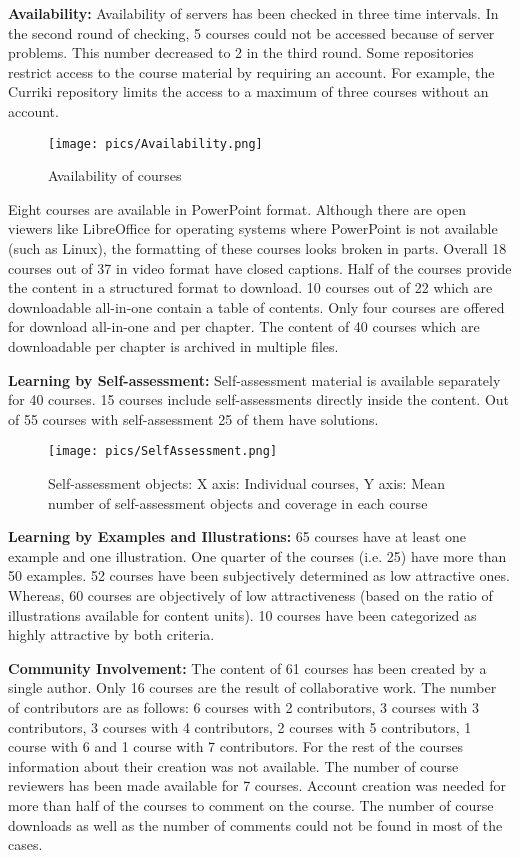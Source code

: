 \documentclass{sig-alternate}
\let\ednote\Ednote
\theoremstyle{definition}
\begin{document}
\noindent\textbf{Availability:}
Availability of servers has been checked in three time intervals.
In the second round of checking, 5 courses could not be accessed because of server problems.
This number decreased to 2 in the third round.
Some repositories restrict access to the course material by requiring an account.
For example, the Curriki repository limits the access to a maximum of three courses without an account.
\begin{figure}[h]
\texttt{[image: pics/Availability.png]}
\caption{Availability of courses}
\label{fig:availability}
\end{figure}
Eight courses are available in PowerPoint format.
Although there are open viewers like LibreOffice for operating systems where PowerPoint is not available (such as Linux), the formatting of these courses looks broken in parts.
Overall 18 courses out of 37 in video format have closed captions. 
Half of the courses provide the content in a structured format to download. 
10 courses out of 22 which are downloadable all-in-one contain a table of contents.
Only four courses are offered for download all-in-one and per chapter.
The content of 40 courses which are downloadable per chapter is archived in multiple files.
 
\noindent\textbf{Learning by Self-assessment:}
Self-assessment material is available separately for 40 courses.
15 courses include self-assessments directly inside the content. 
Out of 55 courses with self-assessment 25 of them have solutions. 

\begin{figure}[h]
\texttt{[image: pics/SelfAssessment.png]}
\caption{Self-assessment objects: X axis: Individual courses, Y axis: Mean number of self-assessment objects and coverage in each course}
\label{fig:Self-assessment}
\end{figure}

\noindent\textbf{Learning by Examples and Illustrations:}
65 courses have at least one example and one illustration.
One quarter of the courses (i.e. 25) have more than 50 examples.
52 courses have been subjectively determined as low attractive ones.
Whereas, 60 courses are objectively of low attractiveness (based on the ratio of illustrations available for content units).
10 courses have been categorized as highly attractive by both criteria.

\noindent\textbf{Community Involvement:}
The content of 61 courses has been created by a single author.
Only 16 courses are the result of collaborative work.
The number of contributors are as follows:
6 courses with 2 contributors, 
3 courses with 3 contributors, 
3 courses with 4 contributors, 
2 courses with 5 contributors, 
1 course with 6 and 
1 course with 7 contributors. 
\ednote{edit}
For the rest of the courses information about their creation was not available.
The number of course reviewers has been made available for 7 courses.
Account creation was needed for more than half of the courses to comment on the course. 
The number of course downloads as well as the number of comments could not be found in most of the cases.
\end{document}
